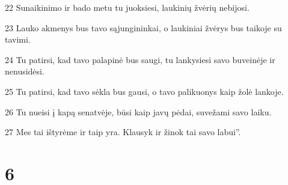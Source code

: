 \par 22 Sunaikinimo ir bado metu tu juoksiesi, laukinių žvėrių nebijosi. 
\par 23 Lauko akmenys bus tavo sąjungininkai, o laukiniai žvėrys bus taikoje su tavimi. 
\par 24 Tu patirsi, kad tavo palapinė bus saugi, tu lankysiesi savo buveinėje ir nenusidėsi. 
\par 25 Tu patirsi, kad tavo sėkla bus gausi, o tavo palikuonys kaip žolė lankoje. 
\par 26 Tu nueisi į kapą senatvėje, būsi kaip javų pėdai, suvežami savo laiku. 
\par 27 Mes tai ištyrėme ir taip yra. Klausyk ir žinok tai savo labui”.



\chapter{6}

